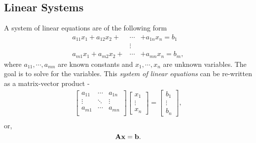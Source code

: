 \documentclass[../../main.tex]{subfiles}
\begin{document}
\subsection{Linear Systems}

\noindent


A system of linear equations are of the following form
\begin{eqnarray*}
    a_{11}x_{1} + a_{12}x_{2} + &\cdots& + a_{1n}x_{n} = b_{1} \\
    &\vdots& \\
    a_{m1}x_{1} + a_{m2}x_{2} + &\cdots& + a_{mn}x_{n} = b_{m}, 
\end{eqnarray*}
where $a_{11}, \cdots, a_{mn}$ are known constants and $x_{1}, \cdots, x_{n}$ are unknown variables. The goal is to solve for the variables. This \textit{system of linear equations} can be re-written as a matrix-vector product -
\begin{align*}
    \begin{bmatrix}
        a_{11} & \cdots & a_{1n} \\
        \vdots & \ddots & \vdots \\
        a_{m1} & \cdots & a_{mn} \\
    \end{bmatrix}
    \begin{bmatrix}
        x_{1} \\
        \vdots \\
        x_{n}
    \end{bmatrix} =
    \begin{bmatrix}
        b_{1} \\
        \vdots \\
        b_{n}
    \end{bmatrix}, \\
\end{align*}
or, 
\begin{equation}
    \mathbf{A} \mathbf{x} = \mathbf{b}.
\end{equation}
\end{document}
